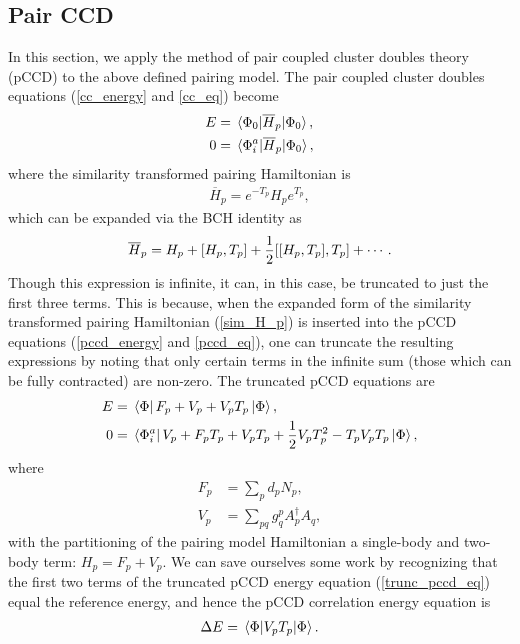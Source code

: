 \documentclass[10pt]{article}
\begin{document}
\subsection{Pair CCD}

In this section, we apply the method of pair coupled cluster doubles theory (pCCD) to the above defined pairing model. The pair coupled cluster doubles equations (\ref{cc_energy} and \ref{cc_eq}) become
\begin{align}
\label{pccd_energy} 
E&=\mel{\Phi_0}{\overline{H}_p}{\Phi_0},
\\
\label{pccd_eq}
0&=\mel*{\Phi_i^a}{\overline{H}_p}{\Phi_0}
,\end{align}
where the similarity transformed pairing Hamiltonian is
\begin{align}
\overline{H}_p=e^{-T_p}H_pe^{T_p}
,\end{align}
which can be expanded via the BCH identity as
\begin{align}
\label{sim_H_p}
\overline{H}_p=H_p+\comm{H_p}{T_p}+\frac{1}{2}\comm{\comm{H_p}{T_p}}{T_p}+\cdots
.\end{align}
Though this expression is infinite, it can, in this case, be truncated to just the first three terms. This is because, when the expanded form of the similarity transformed pairing Hamiltonian (\ref{sim_H_p}) is inserted into the pCCD equations (\ref{pccd_energy} and \ref{pccd_eq}), one can truncate the resulting expressions by noting that only certain terms in the infinite sum (those which can be fully contracted) are non-zero. The truncated pCCD equations are
\begin{align}
\label{trunc_pccd_e}
E
&=
\bra*{\Phi}F_p+V_p+V_pT_p\ket{\Phi},
\\
\label{trunc_pccd_eq}
0
&=
\bra*{\Phi_i^a}V_p+F_pT_p+V_pT_p+\frac{1}{2}V_pT_p^2-T_pV_pT_p\ket{\Phi}
,\end{align}
where
\begin{align}
F_p
&=
\sum_pd_pN_p,
\\
V_p
&=
\sum_{pq}g^p_qA^\dagger_pA_q
,\end{align}
with the partitioning of the pairing model Hamiltonian a single-body and two-body term: $H_p=F_p+V_p$. We can save ourselves some work by recognizing that the first two terms of the truncated pCCD energy equation (\ref{trunc_pccd_eq}) equal the reference energy, and hence the pCCD correlation energy equation is
\begin{align}
\label{pccd_e_corr}
\Delta E = \mel{\Phi}{V_pT_p}{\Phi}
.\end{align}
\end{document}
